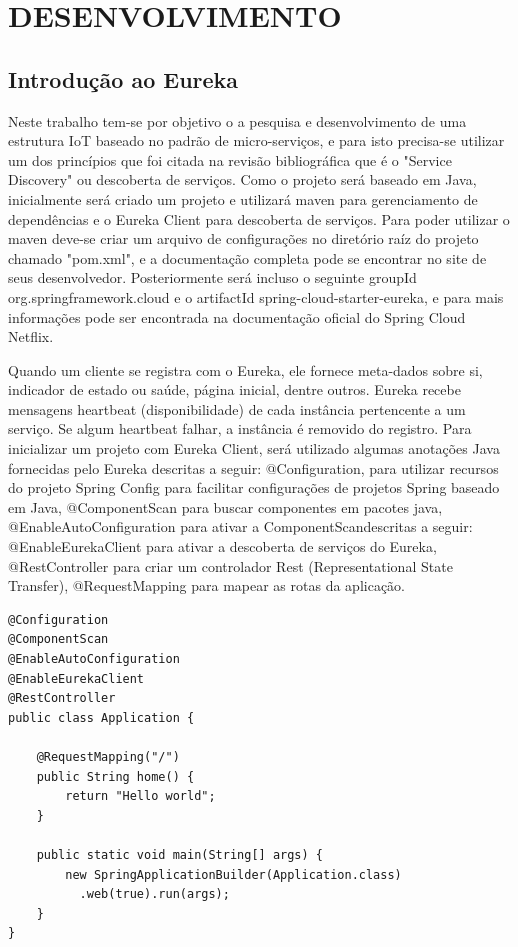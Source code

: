 \section{DESENVOLVIMENTO}

\subsection{Introdução ao Eureka}

Neste trabalho tem-se por objetivo o a pesquisa e desenvolvimento de uma estrutura IoT baseado no padrão de micro-serviços, e para isto precisa-se utilizar um dos princípios que foi citada na revisão bibliográfica que é o "Service Discovery" ou descoberta de serviços. Como o projeto será baseado em Java, inicialmente será criado um projeto e  utilizará maven para gerenciamento de dependências e o Eureka Client para descoberta de serviços. Para poder utilizar o maven deve-se criar um arquivo de configurações no diretório raíz do projeto chamado "pom.xml", e a documentação completa pode se encontrar no site de seus desenvolvedor. Posteriormente será incluso o seguinte groupId org.springframework.cloud e o artifactId spring-cloud-starter-eureka, e para mais informações pode ser encontrada na documentação oficial do Spring Cloud Netflix.

Quando um cliente se registra com o Eureka, ele fornece meta-dados sobre si, indicador de estado ou saúde, página inicial, dentre outros. Eureka recebe mensagens heartbeat (disponibilidade) de cada instância pertencente a um serviço. Se algum heartbeat falhar, a instância é removido do registro.
Para inicializar um projeto com Eureka Client, será utilizado algumas anotações Java fornecidas pelo Eureka descritas a seguir: @Configuration, para utilizar recursos do projeto Spring Config para facilitar configurações de projetos Spring baseado em Java, @ComponentScan para buscar componentes em pacotes java, @EnableAutoConfiguration para ativar a ComponentScandescritas a seguir: @EnableEurekaClient para ativar a descoberta de serviços do Eureka, @RestController para criar um controlador Rest (Representational State Transfer), @RequestMapping para mapear as rotas da aplicação.

\begin{verbatim}
@Configuration
@ComponentScan
@EnableAutoConfiguration
@EnableEurekaClient
@RestController
public class Application {

    @RequestMapping("/")
    public String home() {
        return "Hello world";
    }

    public static void main(String[] args) {
        new SpringApplicationBuilder(Application.class)
          .web(true).run(args);
    }
}
\end{verbatim}

